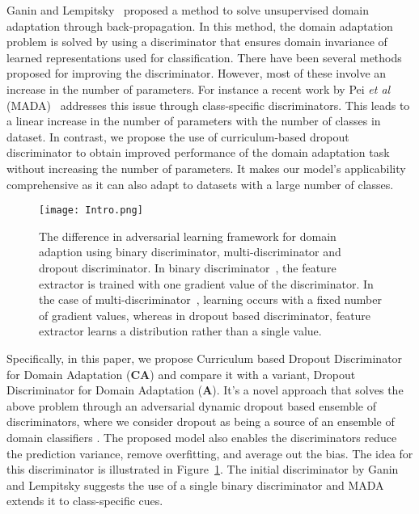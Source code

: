 \documentclass{bmvc2k}
\begin{document}
Ganin and Lempitsky~\cite{ganin_ICML2015} proposed a method to solve unsupervised domain adaptation through back-propagation. In this method, the domain adaptation problem is solved by using a discriminator that ensures domain invariance of learned representations used for classification. There have been several methods \cite{tzeng_CVPR2017, hoffman_arxiv2017,shen_arxiv2017} proposed for improving the discriminator. However, most of these involve an increase in the number of parameters. For instance a recent work by Pei \textit{et al} (MADA)~\cite{pei_arxiv2018} addresses this issue through class-specific discriminators. This leads to a linear increase in the number of parameters with the number of classes in  dataset. In contrast, we propose the use of curriculum-based dropout discriminator to obtain improved performance of the domain adaptation task without increasing the number of parameters. It makes our model's applicability comprehensive as it can also adapt to datasets with a large number of classes.
\begin{figure}
 \centering
    \texttt{[image: Intro.png]}
      \caption{The difference in adversarial learning framework for domain adaption using binary discriminator, multi-discriminator and dropout discriminator. In binary discriminator~\cite{ganin_ICML2015}, the feature extractor is trained with one gradient value of the discriminator. In the case of multi-discriminator~\cite{pei_arxiv2018}, learning occurs with a fixed number of gradient values, whereas in dropout based discriminator, feature extractor learns a distribution rather than a single value. }
      \label{fig:intro}
      \vspace{-1.2em}
 \end{figure}
Specifically, in this paper, we propose Curriculum based Dropout Discriminator for Domain Adaptation (\textbf{CA}) and compare it with a variant, Dropout Discriminator for Domain Adaptation (\textbf{A}).  It's a novel approach that solves the above problem through an adversarial dynamic dropout based ensemble of discriminators,  where we consider dropout as being a source of an ensemble of domain classifiers \cite{hara2016analysis}. The proposed model also enables the discriminators reduce the prediction variance, remove overfitting, and average out the bias. The idea for this discriminator is illustrated in Figure~\ref{fig:intro}. The initial discriminator by Ganin and Lempitsky \cite{ganin_ICML2015} suggests the use of a single binary discriminator and MADA~\cite{pei_arxiv2018} extends it to class-specific cues. 
\end{document}
